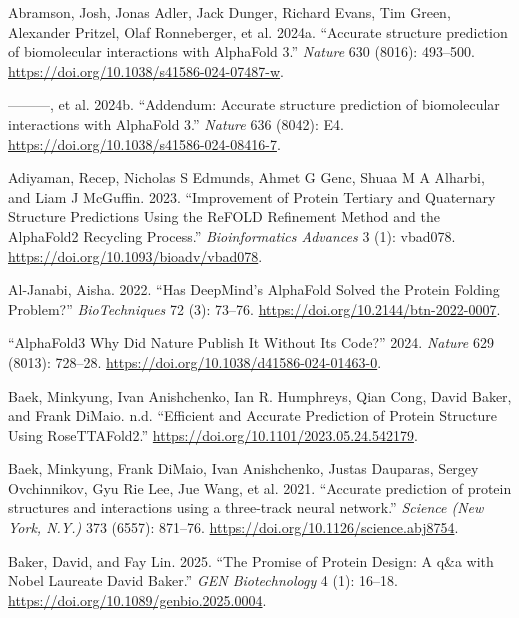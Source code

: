 \documentclass[
]{scrbook}
\newlength{\cslhangindent}
\newenvironment{CSLReferences}[2] %
 {\begin{list}{}{%
  \setlength{\itemindent}{0pt}
  \setlength{\leftmargin}{0pt}
  \setlength{\parsep}{0pt}
  \ifodd #1
   \setlength{\leftmargin}{\cslhangindent}
   \setlength{\itemindent}{-1\cslhangindent}
  \fi
  \setlength{\itemsep}{#2\baselineskip}}}
 {\end{list}}
\begin{document}
\label{refs}
\begin{CSLReferences}{1}{0}
Abramson, Josh, Jonas Adler, Jack Dunger, Richard Evans, Tim Green,
Alexander Pritzel, Olaf Ronneberger, et al. 2024a. {``Accurate structure
prediction of biomolecular interactions with AlphaFold 3.''}
\emph{Nature} 630 (8016): 493--500.
\url{https://doi.org/10.1038/s41586-024-07487-w}.

---------, et al. 2024b. {``Addendum: Accurate structure prediction of
biomolecular interactions with AlphaFold 3.''} \emph{Nature} 636 (8042):
E4. \url{https://doi.org/10.1038/s41586-024-08416-7}.

Adiyaman, Recep, Nicholas S Edmunds, Ahmet G Genc, Shuaa M A Alharbi,
and Liam J McGuffin. 2023. {``Improvement of Protein Tertiary and
Quaternary Structure Predictions Using the ReFOLD Refinement Method and
the AlphaFold2 Recycling Process.''} \emph{Bioinformatics Advances} 3
(1): vbad078. \url{https://doi.org/10.1093/bioadv/vbad078}.

Al-Janabi, Aisha. 2022. {``Has DeepMind's AlphaFold Solved the Protein
Folding Problem?''} \emph{BioTechniques} 72 (3): 73--76.
\url{https://doi.org/10.2144/btn-2022-0007}.

{``AlphaFold3 {\textemdash} Why Did Nature Publish It Without Its
Code?''} 2024. \emph{Nature} 629 (8013): 728--28.
\url{https://doi.org/10.1038/d41586-024-01463-0}.

Baek, Minkyung, Ivan Anishchenko, Ian R. Humphreys, Qian Cong, David
Baker, and Frank DiMaio. n.d. {``Efficient and Accurate Prediction of
Protein Structure Using RoseTTAFold2.''}
\url{https://doi.org/10.1101/2023.05.24.542179}.

Baek, Minkyung, Frank DiMaio, Ivan Anishchenko, Justas Dauparas, Sergey
Ovchinnikov, Gyu Rie Lee, Jue Wang, et al. 2021. {``Accurate prediction
of protein structures and interactions using a three-track neural
network.''} \emph{Science (New York, N.Y.)} 373 (6557): 871--76.
\url{https://doi.org/10.1126/science.abj8754}.

Baker, David, and Fay Lin. 2025. {``The Promise of Protein Design: A
q\&a with Nobel Laureate David Baker.''} \emph{GEN Biotechnology} 4 (1):
16--18. \url{https://doi.org/10.1089/genbio.2025.0004}.


\end{CSLReferences}
\end{document}
